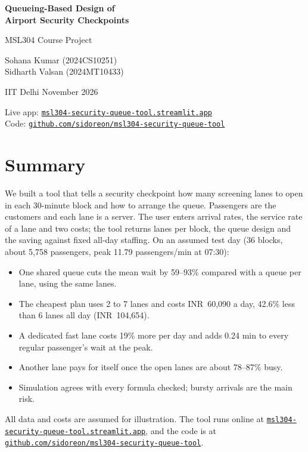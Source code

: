 \documentclass[11pt,a4paper]{article}
\begin{document}
\begin{titlepage}
\centering
\vspace*{5cm}
{\Huge\bfseries Queueing-Based Design of\\[0.3em] Airport Security Checkpoints\par}
\vspace{1em}
{\Large MSL304 Course Project\par}
\vspace{3cm}
{\large Sohana Kumar (2024CS10251)\\ Sidharth Valsan (2024MT10433)\par}
\vspace{1em}
IIT Delhi \textperiodcentered{} November 2026
\vfill
{\small Live app: \href{https://msl304-security-queue-tool.streamlit.app/}{\nolinkurl{msl304-security-queue-tool.streamlit.app}}\\[0.3em]
Code: \href{https://github.com/sidoreon/msl304-security-queue-tool}{\nolinkurl{github.com/sidoreon/msl304-security-queue-tool}}\par}
\end{titlepage}

\section*{Summary}
We built a tool that tells a security checkpoint how many screening lanes to open in each 30-minute block and how to arrange the queue. Passengers are the customers and each lane is a server. The user enters arrival rates, the service rate of a lane and two costs; the tool returns lanes per block, the queue design and the saving against fixed all-day staffing. On an assumed test day (36 blocks, about 5{,}758 passengers, peak 11.79 passengers/min at 07:30):

\begin{itemize}
\item One shared queue cuts the mean wait by 59--93\% compared with a queue per lane, using the same lanes.
\item The cheapest plan uses 2 to 7 lanes and costs \textrm{INR}~60{,}090 a day, 42.6\% less than 6 lanes all day (\textrm{INR}~104{,}654).
\item A dedicated fast lane costs 19\% more per day and adds 0.24 min to every regular passenger's wait at the peak.
\item Another lane pays for itself once the open lanes are about 78--87\% busy.
\item Simulation agrees with every formula checked; bursty arrivals are the main risk.
\end{itemize}
All data and costs are assumed for illustration. The tool runs online at \href{https://msl304-security-queue-tool.streamlit.app/}{\nolinkurl{msl304-security-queue-tool.streamlit.app}}, and the code is at \href{https://github.com/sidoreon/msl304-security-queue-tool}{\nolinkurl{github.com/sidoreon/msl304-security-queue-tool}}.
\end{document}
